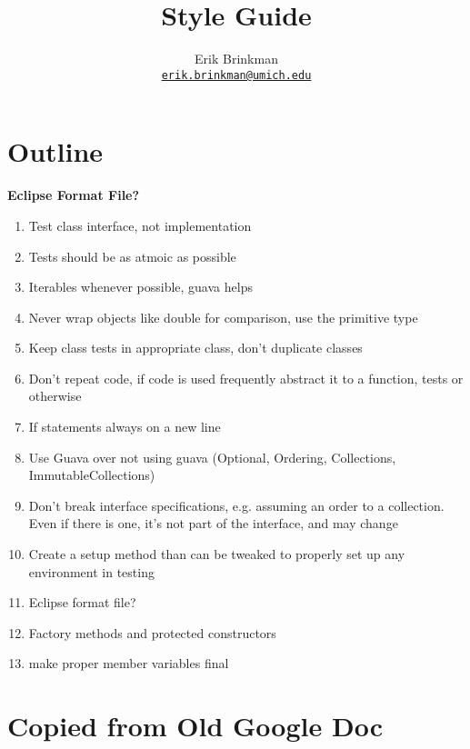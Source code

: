 \documentclass{article}
\newcommand{\email}[1]{\href{mailto:#1}{\texttt{#1}}}
\begin{document}
\title{Style Guide}
\author{Erik Brinkman \\ \email{erik.brinkman@umich.edu}}
\maketitle

\section{Outline}

\textbf{Eclipse Format File?}

\begin{enumerate}
\item Test class interface, not implementation
\item Tests should be as atmoic as possible
\item Iterables whenever possible, guava helps
\item Never wrap objects like double for comparison, use the primitive type
\item Keep class tests in appropriate class, don't duplicate classes
\item Don't repeat code, if code is used frequently abstract it to a function,
  tests or otherwise
\item If statements always on a new line
\item Use Guava over not using guava (Optional, Ordering, Collections,
  ImmutableCollections)
\item Don't break interface specifications, e.g. assuming an order to a
  collection. Even if there is one, it's not part of the interface, and may
  change
\item Create a setup method than can be tweaked to properly set up any
  environment in testing
\item Eclipse format file?
\item Factory methods and protected constructors
\item make proper member variables final
\end{enumerate}

\section{Copied from Old Google Doc}
\end{document}
